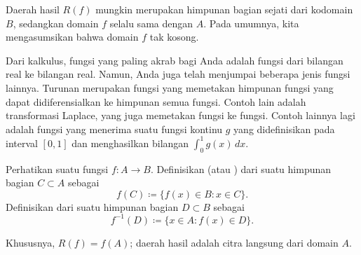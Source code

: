 Daerah hasil $R(f)$ mungkin merupakan himpunan bagian sejati dari kodomain $B$,
sedangkan domain $f$ selalu sama dengan $A$.  Pada umumnya, kita
mengasumsikan bahwa domain $f$ tak kosong.

\begin{example}
Dari kalkulus, fungsi yang paling akrab bagi Anda adalah fungsi dari bilangan real ke
bilangan real.  Namun, Anda juga telah menjumpai beberapa jenis fungsi lainnya.
Turunan merupakan fungsi yang memetakan himpunan
fungsi yang dapat didiferensialkan ke himpunan semua fungsi.
Contoh lain adalah transformasi Laplace, yang juga
memetakan fungsi ke fungsi.  Contoh lainnya lagi adalah fungsi yang menerima
suatu fungsi kontinu $g$ yang didefinisikan pada interval $[0,1]$ dan menghasilkan
bilangan $\int_0^1 g(x) \,dx$.
\end{example}

\begin{defn}
Perhatikan suatu fungsi $f \colon A \to B$.  Definisikan
\emph{} (atau \emph{}) dari suatu himpunan bagian
$C \subset A$ sebagai
\begin{equation*}
f(C) \coloneqq \bigl\{ f(x) \in B : x \in C \bigr\} .
\end{equation*}
Definisikan \emph{} dari suatu himpunan bagian $D
\subset B$ sebagai
\begin{equation*}
f^{-1}(D) \coloneqq \bigl\{ x \in A : f(x) \in D \bigr\} .
\end{equation*}
\end{defn}

Khususnya, $R(f) = f(A)$; daerah hasil adalah citra langsung dari
domain $A$.

\begin{myfigureht}
\caption{Contoh citra langsung dan prapeta untuk fungsi
$f \colon \{ 1,2,3,4 \} \to \{ a,b,c,d \}$ yang didefinisikan oleh
$f(1) \coloneqq b$,
$f(2) \coloneqq d$,
$f(3) \coloneqq c$,
$f(4) \coloneqq b$.\label{figfuncimags}}
\end{myfigureht}

